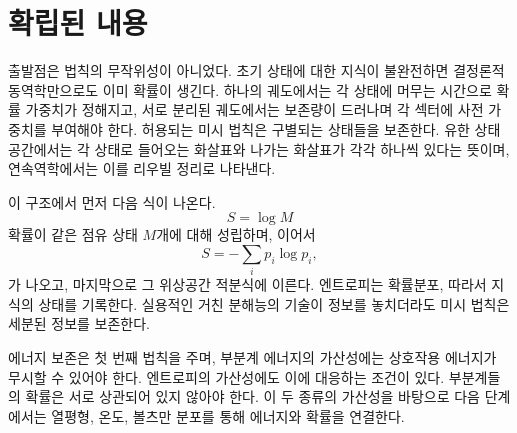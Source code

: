 \section{확립된 내용}

출발점은 법칙의 무작위성이 아니었다. 초기 상태에 대한 지식이 불완전하면 결정론적 동역학만으로도 이미 확률이 생긴다. 하나의 궤도에서는 각 상태에 머무는 시간으로 확률 가중치가 정해지고, 서로 분리된 궤도에서는 보존량이 드러나며 각 섹터에 사전 가중치를 부여해야 한다. 허용되는 미시 법칙은 구별되는 상태들을 보존한다. 유한 상태공간에서는 각 상태로 들어오는 화살표와 나가는 화살표가 각각 하나씩 있다는 뜻이며, 연속역학에서는 이를 리우빌 정리로 나타낸다.

이 구조에서 먼저 다음 식이 나온다.
\begin{equation}
 S=\log M
\end{equation}
확률이 같은 점유 상태 \(M\)개에 대해 성립하며, 이어서
\begin{equation}
 S=-\sum_i p_i\log p_i,
\end{equation}
가 나오고, 마지막으로 그 위상공간 적분식에 이른다. 엔트로피는 확률분포, 따라서 지식의 상태를 기록한다. 실용적인 거친 분해능의 기술이 정보를 놓치더라도 미시 법칙은 세분된 정보를 보존한다.

에너지 보존은 첫 번째 법칙을 주며, 부분계 에너지의 가산성에는 상호작용 에너지가 무시할 수 있어야 한다. 엔트로피의 가산성에도 이에 대응하는 조건이 있다. 부분계들의 확률은 서로 상관되어 있지 않아야 한다. 이 두 종류의 가산성을 바탕으로 다음 단계에서는 열평형, 온도, 볼츠만 분포를 통해 에너지와 확률을 연결한다.
